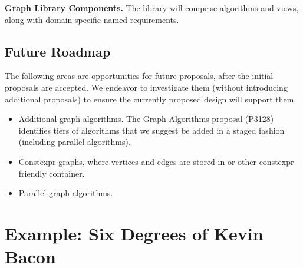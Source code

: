 \textbf{Graph Library Components.}  The library will comprise algorithms and views, along with domain-specific
named requirements.

%



\subsection{Future Roadmap}

The following areas are opportunities for future proposals, after the initial proposals are accepted. We endeavor to investigate
them (without introducing additional proposals) to ensure the currently proposed design will support them.
\begin{itemize}
      \item Additional graph algorithms. The Graph Algorithms proposal (\href{https://www.wg21.link/P3128}{P3128}) identifies 
            tiers of algorithms that we suggest be added in a staged fashion (including parallel algorithms).
      \item Constexpr graphs, where vertices and edges are stored in  or other constexpr-friendly container.
      \item Parallel graph algorithms.
\end{itemize}



\section{Example: Six Degrees of Kevin Bacon}
\label{sec:bacon}

